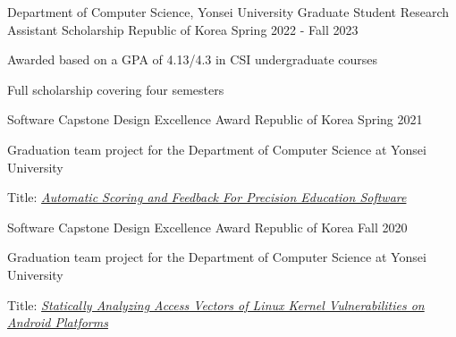 

\begin{cventries}

  \cventry
    {Department of Computer Science, Yonsei University} %
    {Graduate Student Research Assistant Scholarship} %
    {Republic of Korea} %
    {Spring 2022 - Fall 2023} %
    {
      \begin{cvitems} %
        \item {Awarded based on a GPA of 4.13/4.3 in CSI undergraduate courses}
        \item {Full scholarship covering four semesters}
      \end{cvitems}
    }

  \cventry
    {Software Capstone Design} %
    {Excellence Award} %
    {Republic of Korea} %
    {Spring 2021} %
    {
      \begin{cvitems}
        \item {Graduation team project for the Department of Computer Science at Yonsei University}
        \item {Title: \href{https://docs.google.com/document/d/14OhRL9QE26p47pvKkOurn-uUZJICLSA1G2RVAD_P13c/edit?usp=sharing}{\textit{Automatic Scoring and Feedback For Precision Education Software}}}
      \end{cvitems}
    }

  \cventry
    {Software Capstone Design} %
    {Excellence Award} %
    {Republic of Korea} %
    {Fall 2020} %
    {
      \begin{cvitems}
        \item {Graduation team project for the Department of Computer Science at Yonsei University}
        \item {Title: \href{https://drive.google.com/file/d/1RgZgifnHedxJ21c6xtl_vPQS3rqL6xff/view?usp=sharing}{\textit{Statically Analyzing Access Vectors of Linux Kernel Vulnerabilities on Android Platforms}}}
      \end{cvitems}
    }

\end{cventries}
